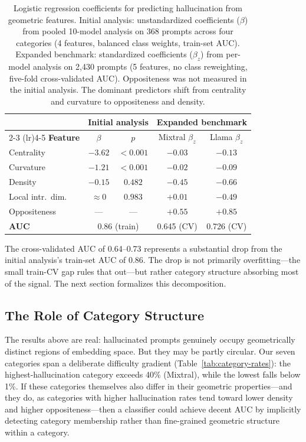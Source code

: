 \begin{table}[H]
\centering
\small
\begin{tabular}{lcccc}
\toprule
& \multicolumn{2}{c}{\textbf{Initial analysis}} & \multicolumn{2}{c}{\textbf{Expanded benchmark}} \\
\cmidrule(lr){2-3} \cmidrule(lr){4-5}
\textbf{Feature} & $\beta$ & $p$ & Mixtral $\beta_z$ & Llama $\beta_z$ \\
\midrule
Centrality      & $-3.62$ & ${<}0.001$ & $-0.03$ & $-0.13$ \\
Curvature       & $-1.21$ & ${<}0.001$ & $-0.02$ & $-0.09$ \\
Density         & $-0.15$ & $0.482$    & $-0.45$ & $-0.66$ \\
Local intr.\ dim. & $\approx 0$ & $0.983$ & $+0.01$ & $-0.49$ \\
Oppositeness    & ---     & ---        & $+0.55$ & $+0.85$ \\
\midrule
\textbf{AUC}    & \multicolumn{2}{c}{0.86 (train)} & 0.645 (CV) & 0.726 (CV) \\
\bottomrule
\end{tabular}
\caption{Logistic regression coefficients for predicting hallucination from geometric features. Initial analysis: unstandardized coefficients ($\beta$) from pooled 10-model analysis on 368 prompts across four categories (4 features, balanced class weights, train-set AUC). Expanded benchmark: standardized coefficients ($\beta_z$) from per-model analysis on 2,430 prompts (5 features, no class reweighting, five-fold cross-validated AUC). Oppositeness was not measured in the initial analysis. The dominant predictors shift from centrality and curvature to oppositeness and density.}
\label{tab:logistic-comparison}
\end{table}

The cross-validated AUC of 0.64--0.73 represents a substantial drop from the initial analysis's train-set AUC of 0.86. The drop is not primarily overfitting---the small train-CV gap rules that out---but rather category structure absorbing most of the signal. The next section formalizes this decomposition.

\subsection{The Role of Category Structure}
\label{sec:category-confound-preview}

The results above are real: hallucinated prompts genuinely occupy geometrically distinct regions of embedding space. But they may be partly circular. Our seven categories span a deliberate difficulty gradient (Table~\ref{tab:category-rates}): the highest-hallucination category exceeds 40\% (Mixtral), while the lowest falls below 1\%. If these categories themselves also differ in their geometric properties---and they do, as categories with higher hallucination rates tend toward lower density and higher oppositeness---then a classifier could achieve decent AUC by implicitly detecting category membership rather than fine-grained geometric structure within a category.

